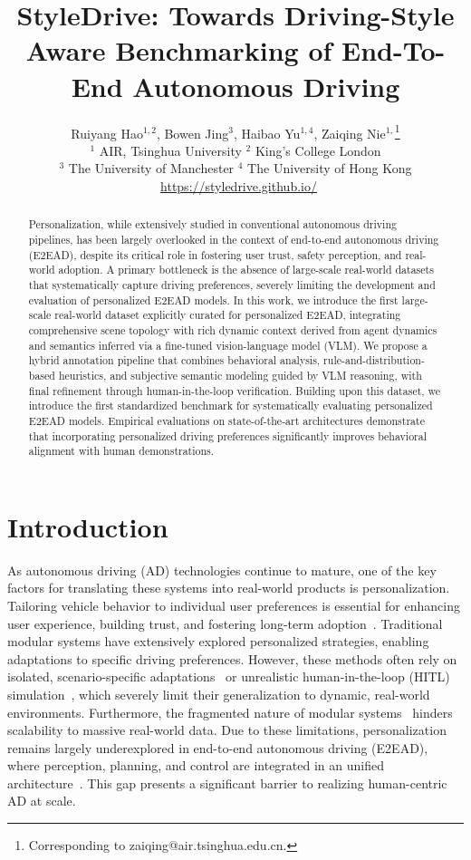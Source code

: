 \documentclass{article}
\title{StyleDrive: Towards Driving-Style Aware Benchmarking of End-To-End Autonomous Driving}
\author{%
  Ruiyang Hao$^{1,2}$, Bowen Jing$^{3}$, Haibao Yu$^{1,4}$, Zaiqing Nie$^{1,}$\thanks{Corresponding to zaiqing@air.tsinghua.edu.cn.} \\
  $^{1}$ AIR, Tsinghua University\;  $^{2}$ King's College London \\
  $^{3}$ The University of Manchester\; $^{4}$ The University of Hong Kong\\
  \normalsize{
    ~\url{https://styledrive.github.io/}
    }
}
\begin{document}
\maketitle

\begin{abstract}
Personalization, while extensively studied in conventional autonomous driving pipelines, has been largely overlooked in the context of end-to-end autonomous driving (E2EAD), despite its critical role in fostering user trust, safety perception, and real-world adoption. 
A primary bottleneck is the absence of large-scale real-world datasets that systematically capture driving preferences, severely limiting the development and evaluation of personalized E2EAD models. 
In this work, we introduce the first large-scale real-world dataset explicitly curated for personalized E2EAD, integrating comprehensive scene topology with rich dynamic context derived from agent dynamics and semantics inferred via a fine-tuned vision-language model (VLM). 
We propose a hybrid annotation pipeline that combines behavioral analysis, rule-and-distribution-based heuristics, and subjective semantic modeling guided by VLM reasoning, with final refinement through human-in-the-loop verification. 
Building upon this dataset, we introduce the first standardized benchmark for systematically evaluating personalized E2EAD models. 
Empirical evaluations on state-of-the-art architectures demonstrate that incorporating personalized driving preferences significantly improves behavioral alignment with human demonstrations.
\end{abstract}

\section{Introduction}

As autonomous driving (AD) technologies continue to mature, one of the key factors for translating these systems into real-world products is personalization. Tailoring vehicle behavior to individual user preferences is essential for enhancing user experience, building trust, and fostering long-term
adoption~\cite{hasenjager2017personalization}. Traditional modular systems have extensively explored personalized strategies, enabling adaptations to specific driving preferences. However, these methods often rely on isolated, scenario-specific adaptations~\cite{tian2022personalized} or unrealistic human-in-the-loop (HITL) simulation~\cite{ke2024d2e}, which severely limit their generalization to dynamic, real-world environments. Furthermore, the fragmented nature of modular systems~\cite{zhu2018personalized, cui2024personalized, kou2025padriver} hinders scalability to massive real-world data. Due to these limitations, personalization remains largely underexplored in end-to-end autonomous driving (E2EAD), where perception, planning, and control are integrated in an unified architecture~\cite{codevilla2018end}. This gap presents a significant barrier to realizing human-centric AD at scale.
\end{document}

